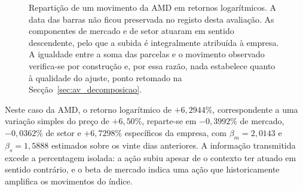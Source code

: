 \begin{figure}[htbp]
\centering
{}
\caption[Um movimento repartido em três parcelas]{Repartição de um movimento da AMD em retornos
logarítmicos. A data das barras não ficou preservada no registo desta avaliação. As componentes de mercado e de setor atuaram em sentido
descendente, pelo que a subida é integralmente atribuída à empresa. A igualdade entre a soma das
parcelas e o movimento observado verifica-se por construção e, por essa razão, nada estabelece
quanto à qualidade do ajuste, ponto retomado na Secção~\ref{sec:av_decomposicao}.}
\label{fig:met_decomposicao}
\end{figure}

Neste caso da AMD, o retorno logarítmico de $+6{,}2944\%$,
correspondente a uma variação simples do preço de $+6{,}50\%$, reparte-se em $-0{,}3992\%$ de mercado, $-0{,}0362\%$ de setor e $+6{,}7298\%$ específicos da
empresa, com $\beta_m = 2{,}0143$ e $\beta_s = 1{,}5888$ estimados sobre os vinte dias anteriores.
A informação transmitida excede a percentagem isolada: a ação subiu apesar de o contexto ter
atuado em sentido contrário, e o beta de mercado indica uma ação que historicamente amplifica os
movimentos do índice.

